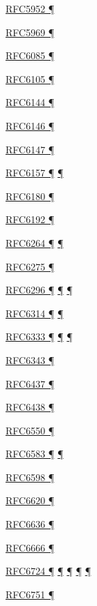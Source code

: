 \documentclass[
]{article}
\begin{document}
\hyperref[addresses]{RFC5952 ¶}

\hyperref[tunnels]{RFC5969 ¶}

\hyperref[layer-2-functions]{RFC6085 ¶}

\hyperref[layer-2-considerations]{RFC6105 ¶}

\hyperref[translation-and-ipv4-as-a-service]{RFC6144 ¶}

\hyperref[translation-and-ipv4-as-a-service]{RFC6146 ¶}

\hyperref[translation-and-ipv4-as-a-service]{RFC6147 ¶}

\hyperref[dual-stack-scenarios]{RFC6157 ¶} \hyperref[multihoming]{¶}

\hyperref[coexistence-with-legacy-ipv4]{RFC6180 ¶}

\hyperref[filtering]{RFC6192 ¶}

\hyperref[obsolete-techniques]{RFC6264 ¶} \hyperref[tunnels]{¶}

\hyperref[obsolete-features-in-ipv6]{RFC6275 ¶}

\hyperref[translation-and-ipv4-as-a-service]{RFC6296 ¶}
\hyperref[security]{¶} \hyperref[multihoming]{¶}

\hyperref[translation-and-ipv4-as-a-service]{RFC6314 ¶}
\hyperref[multihoming]{¶}

\hyperref[dual-stack-scenarios]{RFC6333 ¶}
\hyperref[translation-and-ipv4-as-a-service]{¶} \hyperref[tunnels]{¶}

\hyperref[obsolete-techniques]{RFC6343 ¶}

\hyperref[traffic-class-and-flow-label]{RFC6437 ¶}

\hyperref[traffic-class-and-flow-label]{RFC6438 ¶}

\hyperref[routing]{RFC6550 ¶}

\hyperref[address-resolution]{RFC6583 ¶}
\hyperref[layer-2-considerations]{¶}

\hyperref[address-planning]{RFC6598 ¶}

\hyperref[layer-2-considerations]{RFC6620 ¶}

\hyperref[address-resolution]{RFC6636 ¶}

\hyperref[filtering]{RFC6666 ¶}

\hyperref[how-an-application-programmer-sees-ipv6]{RFC6724 ¶}
\hyperref[dns]{¶} \hyperref[source-and-destination-address-selection]{¶}
\hyperref[multi-prefix-operation]{¶}
\hyperref[obsolete-features-in-ipv6]{¶}

\hyperref[obsolete-techniques]{RFC6751 ¶}
\end{document}
